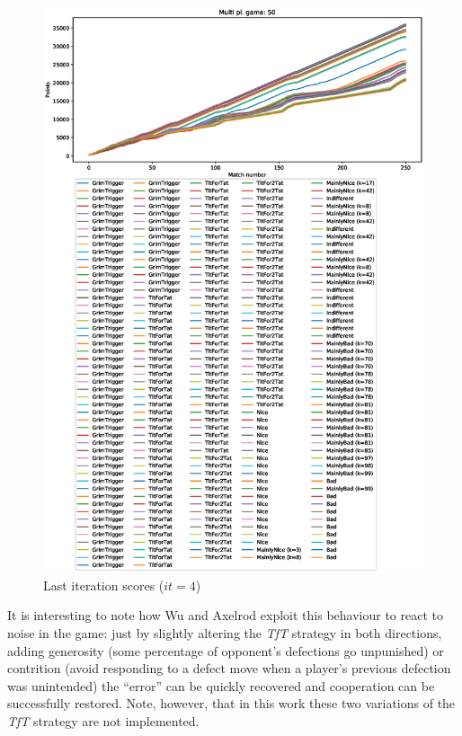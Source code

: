 \documentclass[journal,10pt,twoside]{IEEEtran}
\begin{document}
\begin{figure}[!ht]
    \centering
    \includegraphics[width=1\columnwidth]{../img/ripdmp-incr/ripdmp-scores-increasing-pop-50-r4}
    \caption{Last iteration scores ($it=4$)}
    \label{fig:incrLI}
\end{figure}

It is interesting to note how Wu and Axelrod \cite{IPDnoise} exploit this behaviour to react to noise in the game: just by slightly altering the \textit{TfT} strategy in both directions, adding generosity (some percentage of opponent's defections go unpunished) or contrition (avoid responding to a defect move when a player's previous defection was unintended) the ``error'' can be quickly recovered and cooperation can be successfully restored. Note, however, that in this work these two variations of the \textit{TfT} strategy are not implemented.
\end{document}
